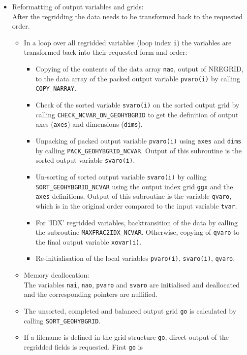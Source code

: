 \documentclass[11pt,twoside]{article}
\begin{document}
\begin{itemize}
\item Reformatting of output variables and grids:\\
After the regridding the data needs to be transformed back to the
requested order.
\begin{itemize} %
\item In a loop over all regridded variables (loop index \verb|i|)
 the variables are transformed back into their requested form and order:
\begin{itemize} %
\item Copying of the contents of the data array \verb|nao|, output of
NREGRID, to the data array of the packed output 
 variable \verb|pvaro(i)| by calling \verb|COPY_NARRAY|. 
\item Check of the sorted variable \verb|svaro(i)| on the sorted output
 grid by calling \verb|CHECK_NCVAR_ON_GEOHYBGRID| to get the
 definition of output axes (\verb|axes|) and dimensions (\verb|dims|).
\item Unpacking of packed output variable \verb|pvaro(i)| using  \verb|axes|
 and  \verb|dims| by calling \verb|PACK_GEOHYBGRID_NCVAR|. Output of
 this subroutine is the sorted output variable \verb|svaro(i)|.
\item Un-sorting of sorted output variable \verb|svaro(i)| by
 calling \verb|SORT_GEOHYBGRID_NCVAR| using the output index
 grid \verb|ggx| and the \verb|axes| definitions. Output of this
 subroutine is the variable \verb|qvaro|, which is in the original
 order compared to the input variable \verb|tvar|.
\item For 'IDX' regridded variables, backtransition of the data by
 calling the subroutine \verb|MAXFRAC2IDX_NCVAR|. Otherwise, copying of
  \verb|qvaro| to the final output variable \verb|xovar(i)|.
\item Re-initialisation of the local
 variables \verb|pvaro(i)|, \verb|svaro(i)|, \verb|qvaro|.
\end{itemize} %
\item Memory deallocation:\\ 
 The variables \verb|nai|, \verb|nao|, \verb|pvaro| and \verb|svaro| are
 initialised and deallocated and  the corresponding pointers are
 nullified.
\item The unsorted, completed and balanced output grid \verb|go| is
 calculated by calling \verb|SORT_GEOHYBGRID|.
\item If a filename is defined in the grid structure \verb|go|, direct
output of the regridded fields is requested. First \verb|go| is

\end{itemize}
\end{itemize}
\end{document}
